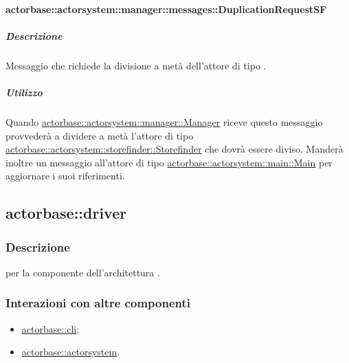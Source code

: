 \documentclass{scalatekids-article}
\begin{document}
\paragraph{actorbase::actorsystem::manager::messages::DuplicationRequestSF}
\label{sec:actorbase::actorsystem::manager::messages::DuplicationRequestSF}

\subparagraph{Descrizione}

Messaggio che richiede la divisione a metà dell'attore di tipo
.

\subparagraph{Utilizzo}

Quando \hyperref[sec:actorbase::actorsystem::manager::Manager]{actorbase::\allowbreak{}actorsystem::\allowbreak{}manager::\allowbreak{}Manager}
riceve questo messaggio provvederà a dividere a metà l'attore di tipo
\hyperref[sec:actorbase::actorsystem::storefinder::Storefinder]{actorbase::\allowbreak{}actorsystem::\allowbreak{}storefinder::\allowbreak{}Storefinder}
che dovrà essere diviso. Manderà inoltre un messaggio all'attore di tipo
\hyperref[sec:actorbase::actorsystem::main::Main]{actorbase::\allowbreak{}actorsystem::\allowbreak{}main::\allowbreak{}Main}
per aggiornare i suoi riferimenti.


\subsection{actorbase::driver}
\label{sec:actorbase::driver}

\subsubsection{Descrizione}

 per la componente  dell'architettura
.

\subsubsection{Interazioni con altre componenti}

\begin{itemize}
\item \hyperref[sec:actorbase::cli]{actorbase::cli};
\item \hyperref[sec:actorbase::actorsystem]{actorbase::actorsystem}.
\end{itemize}
\end{document}
